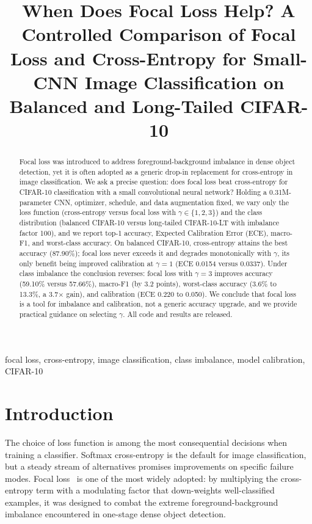 \documentclass[conference]{IEEEtran}
\begin{document}
\title{When Does Focal Loss Help? A Controlled Comparison of Focal Loss and
Cross-Entropy for Small-CNN Image Classification on Balanced and Long-Tailed CIFAR-10}

\author{
}

\maketitle

\begin{abstract}
Focal loss was introduced to address foreground-background imbalance in dense object
detection, yet it is often adopted as a generic drop-in replacement for cross-entropy in
image classification. We ask a precise question: does focal loss beat cross-entropy for
CIFAR-10 classification with a small convolutional neural network? Holding a 0.31M-parameter
CNN, optimizer, schedule, and data augmentation fixed, we vary only the loss function
(cross-entropy versus focal loss with $\gamma \in \{1,2,3\}$) and the class distribution
(balanced CIFAR-10 versus long-tailed CIFAR-10-LT with imbalance factor 100), and we report
top-1 accuracy, Expected Calibration Error (ECE), macro-F1, and worst-class accuracy. On
balanced CIFAR-10, cross-entropy attains the best accuracy (87.90\%); focal loss never
exceeds it and degrades monotonically with $\gamma$, its only benefit being improved
calibration at $\gamma=1$ (ECE 0.0154 versus 0.0337). Under class imbalance the conclusion
reverses: focal loss with $\gamma=3$ improves accuracy (59.10\% versus 57.66\%), macro-F1
(by 3.2 points), worst-class accuracy (3.6\% to 13.3\%, a 3.7$\times$ gain), and calibration
(ECE 0.220 to 0.050). We conclude that focal loss is a tool for imbalance and calibration,
not a generic accuracy upgrade, and we provide practical guidance on selecting $\gamma$.
All code and results are released.
\end{abstract}

\begin{IEEEkeywords}
focal loss, cross-entropy, image classification, class imbalance, model calibration, CIFAR-10
\end{IEEEkeywords}

\section{Introduction}
The choice of loss function is among the most consequential decisions when training a
classifier. Softmax cross-entropy is the default for image classification, but a steady stream
of alternatives promises improvements on specific failure modes. Focal loss~\cite{lin2017focal}
is one of the most widely adopted: by multiplying the cross-entropy term with a modulating
factor that down-weights well-classified examples, it was designed to combat the extreme
foreground-background imbalance encountered in one-stage dense object detection.
\end{document}
